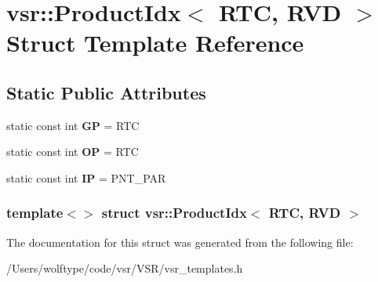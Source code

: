 \hypertarget{structvsr_1_1_product_idx_3_01_r_t_c_00_01_r_v_d_01_4}{\section{vsr\-:\-:Product\-Idx$<$ R\-T\-C, R\-V\-D $>$ Struct Template Reference}
\label{structvsr_1_1_product_idx_3_01_r_t_c_00_01_r_v_d_01_4}
}
\subsection*{Static Public Attributes}
\begin{DoxyCompactItemize}
\item 
\hypertarget{structvsr_1_1_product_idx_3_01_r_t_c_00_01_r_v_d_01_4_aa55f4a22ba96317dcad36fe33e35bcd3}{static const int {\bfseries G\-P} = R\-T\-C}\label{structvsr_1_1_product_idx_3_01_r_t_c_00_01_r_v_d_01_4_aa55f4a22ba96317dcad36fe33e35bcd3}

\item 
\hypertarget{structvsr_1_1_product_idx_3_01_r_t_c_00_01_r_v_d_01_4_a16a8c724d5726498e3a3c2d8113820ea}{static const int {\bfseries O\-P} = R\-T\-C}\label{structvsr_1_1_product_idx_3_01_r_t_c_00_01_r_v_d_01_4_a16a8c724d5726498e3a3c2d8113820ea}

\item 
\hypertarget{structvsr_1_1_product_idx_3_01_r_t_c_00_01_r_v_d_01_4_a81937c40f631d431ce1bbfba412760a5}{static const int {\bfseries I\-P} = P\-N\-T\-\_\-\-P\-A\-R}\label{structvsr_1_1_product_idx_3_01_r_t_c_00_01_r_v_d_01_4_a81937c40f631d431ce1bbfba412760a5}

\end{DoxyCompactItemize}
\subsubsection*{template$<$$>$ struct vsr\-::\-Product\-Idx$<$ R\-T\-C, R\-V\-D $>$}



The documentation for this struct was generated from the following file\-:\begin{DoxyCompactItemize}
\item 
/\-Users/wolftype/code/vsr/\-V\-S\-R/vsr\-\_\-templates.\-h\end{DoxyCompactItemize}
